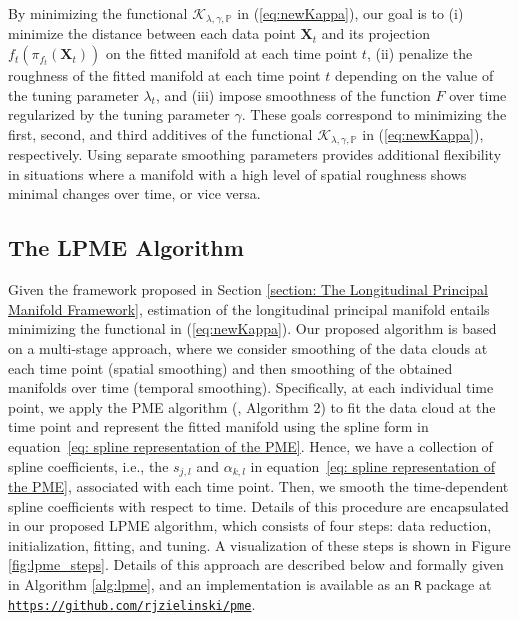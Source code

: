 \documentclass[12pt]{article}
\theoremstyle{definition}
\begin{document}
By minimizing the functional $\mathcal{K}_{\lambda, \gamma, \mathbb{P}}$ in (\ref{eq:newKappa}), our goal is to (i) minimize the distance between each data point $\mathbf{X}_t$ and its projection $f_t\left(\pi_{f_t}(\mathbf{X}_t)\right)$ on the fitted manifold at each time point $t$, (ii) penalize the roughness of the fitted manifold at each time point $t$ depending on the value of the tuning parameter $\lambda_t$, and (iii) impose smoothness of the function $F$ over time regularized by the tuning parameter $\gamma$. These goals correspond to minimizing the first, second, and third additives of the functional $\mathcal{K}_{\lambda, \gamma, \mathbb{P}}$ in (\ref{eq:newKappa}), respectively. Using separate smoothing parameters provides additional flexibility in situations where a manifold with a high level of spatial roughness shows minimal changes over time, or vice versa.







\subsection{The LPME Algorithm}

Given the framework proposed in Section \ref{section: The Longitudinal Principal Manifold Framework}, estimation of the longitudinal principal manifold entails minimizing the functional in (\ref{eq:newKappa}). Our proposed algorithm is based on a multi-stage approach, where we consider smoothing of the data clouds at each time point (spatial smoothing) and then smoothing of the obtained manifolds over time (temporal smoothing). Specifically, at each individual time point, we apply the PME algorithm (\cite{mengPrincipalManifoldEstimation2021}, Algorithm 2) to fit the data cloud at the time point and represent the fitted manifold using the spline form in equation~\eqref{eq: spline representation of the PME}. Hence, we have a collection of spline coefficients, i.e., the $s_{j,l}$ and $\alpha_{k,l}$ in equation~\eqref{eq: spline representation of the PME}, associated with each time point. Then, we smooth the time-dependent spline coefficients with respect to time. Details of this procedure are encapsulated in our proposed LPME algorithm, which consists of four steps: data reduction, initialization, fitting, and tuning. A visualization of these steps is shown in Figure \ref{fig:lpme_steps}. Details of this approach are described below and formally given in Algorithm \ref{alg:lpme}, and an implementation is available as an \texttt{R} package at \href{https://github.com/rjzielinski/pme}{\texttt{https://github.com/rjzielinski/pme}}.
\end{document}
